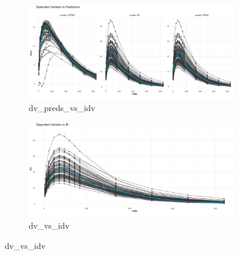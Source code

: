 \begin{figure}[htbp]
    \vspace{1em} %

    \begin{subfigure}[b]{0.45\linewidth}
        \centering
        \includegraphics[width=\linewidth]{fig/img/Xpose/dv_preds_vs_idv.pdf}
        \caption{dv\_preds\_vs\_idv}
        \label{fig:dv_preds_vs_idv}
    \end{subfigure}
    \hfill
    \begin{subfigure}[b]{0.45\linewidth}
        \centering
        \includegraphics[width=\linewidth]{fig/img/Xpose/dv_vs_idv.pdf}
        \caption{dv\_vs\_idv}
        \label{fig:dv_vs_idv}
    \end{subfigure}

    \vspace{1em}


\end{figure}
